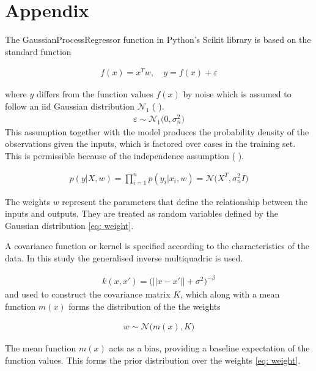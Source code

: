 \documentclass[11pt,a4paper]{article}
\newcommand{\citeboth}[1]{\citeauthor{#1} \citep{#1}}
\begin{document}
\section{Appendix}
\label{sec: appendix}


The GaussianProcessRegressor function in Python's Scikit library is based on the 
standard function

\begin{align} 
    f(x) = x^{T}w, \quad{y = f(x) + \varepsilon}
\end{align}

where $y$ differs from the function values $f(x)$ by noise which is assumed
to follow an iid Gaussian distribution 
$\mathcal{N}_1$ (\citeboth{rasmussen2006}).
\begin{align*}
    \varepsilon \sim \mathcal{N}_1 \bigl(0, \sigma_{n}^2\bigr)
\end{align*}
This assumption together with the model produces the 
probability density of the observations given the inputs, 
which is factored over cases in the training set. This is
permissible because of the independence assumption (\citeboth{rasmussen2006}).

\begin{align}
    p(y|X,w) = \prod_{i=1}^{n} p(y_i|x_i ,w) = \mathcal{N}\bigl(X^T, \sigma_{n}^2 I\bigr)
\end{align}

The weights \( w \) represent the parameters that define the relationship between the inputs and outputs. 
They are treated as random variables defined by the Gaussian distribution \eqref{eq: weight}.


A covariance function or kernel
is specified according to the characteristics of the data. In this study the
generalised inverse multiquadric is used.

\begin{align}
    k(x,x') = \biggl( ||x-x'|| + \sigma^2\biggr)^{-\beta} \label{eq: gimq}
\end{align}
and used to construct the covariance matrix $K$, which along with 
a mean function $m(x)$ forms the distribution of the the weights 

\begin{align}
    w \sim \mathcal{N}\bigl(m(x), K\bigr) \label{eq: weight}
\end{align}


The mean function $m(x)$ acts as a bias, 
providing a baseline expectation of the function values. 
This forms the prior distribution over the weights \eqref{eq: weight}.
\end{document}
